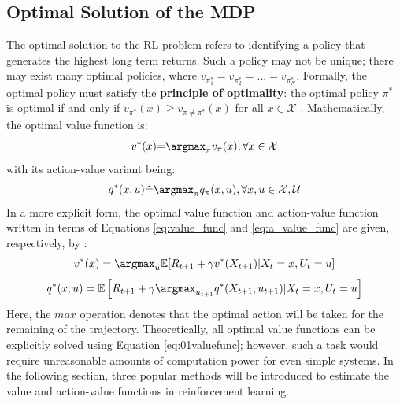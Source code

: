 \subsection{Optimal Solution of the MDP}
The optimal solution to the RL problem refers to identifying a policy that generates the highest long term returns. Such a policy may not be unique; there may exist many optimal policies, where $v_{\pi^*_1} = v_{\pi^*_2} = ... = v_{\pi^*_N}$.  Formally, the optimal policy must satisfy the \textbf{principle of optimality}: the optimal policy $\pi^*$ is optimal if and only if $v_{\pi^*}(x) \geq v_{\pi \neq \pi^*}(x)$ for all $x \in \mathcal{X}$ \cite{PO}. Mathematically, the optimal value function is:
\begin{equation}
    v^*(x) \dot{=} \argmax_{\pi} v_{\pi}(x), \forall x \in \mathcal{X}
\end{equation}
with its action-value variant being:
\begin{equation}
    q^*(x, u) \dot{=} \argmax_{\pi} q_{\pi}(x, u), \forall x, u \in \mathcal{X, U}
\end{equation}
In a more explicit form, the optimal value function and action-value function written in terms of Equations \ref{eq:value_func} and \ref{eq:a_value_func} are given, respectively, by \cite{sutton}:
\begin{equation}
    v^*(x) = \argmax_{u} \mathbb{E}[R_{t+1} + \gamma v^*(X_{t+1}) | X_t = x, U_t = u]
    \label{eq:01valuefunc}
\end{equation}
\begin{equation}
    q^*(x, u) = \mathbb{E}\left[R_{t+1} + \gamma \argmax_{u_{t+1}} q^*(X_{t+1}, u_{t+1}) | X_t = x, U_t = u \right]
\end{equation}
Here, the $max$ operation denotes that the optimal action will be taken for the remaining of the trajectory. Theoretically, all optimal value functions can be explicitly solved using Equation \ref{eq:01valuefunc}; however, such a task would require unreasonable amounts of computation power for even simple systems. In the following section, three popular methods will be introduced to estimate the value and action-value functions in reinforcement learning.

